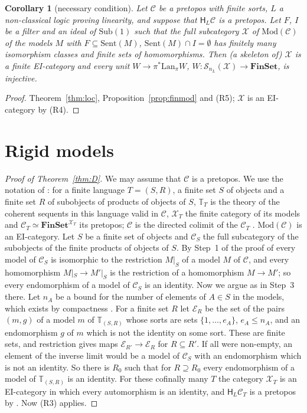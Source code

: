 \documentclass[11pt]{amsart}
\newtheorem{cor}[thm]{Corollary}
\theoremstyle{definition}
\newcommand{\Fin}{\mathbf{FinSet}}
\newcommand{\Sub}{\mathrm{Sub}}
\newcommand{\Mod}{\mathrm{Mod}}
\newcommand{\Sent}{\mathrm{Sent}}
\newcommand{\Lan}{\mathrm{Lan}}
\newcommand{\HH}{\mathsf H}
\newcommand{\cX}{\mathcal X}
\newcommand{\cC}{\mathcal C}
\newcommand{\cS}{\mathcal S}
\newcommand{\bT}{\mathbb T}
\begin{document}
\begin{cor}[necessary condition]\label{cor:nec}
Let $\cC$ be a pretopos with finite sorts, $L$ a non-classical logic proving
linearity, and suppose that $\HH_L\cC$ is a pretopos.
Let $F$, $I$ be a filter and an ideal of $\Sub(1)$ such that the full
subcategory $\cX$ of $\Mod(\cC)$ of the models $M$ with $F\subseteq
\Sent(M)$, $\Sent(M)\cap I=\emptyset$ has finitely many isomorphism
classes and finite sets of homomorphisms. Then (a skeleton of) $\cX$
is a finite EI-category and every unit $W\to\pi^*\Lan_\pi W$, $W\colon
\cS_{n_L}(\cX)\to\Fin$, is injective.
\end{cor}
\begin{proof}
Theorem~\ref{thm:loc}, Proposition~\ref{prop:finmod} and (R5); $\cX$
is an EI-category by (R4).
\end{proof}


\section{Rigid models}

\begin{proof}[Proof of Theorem~\ref{thm:D}]
We may assume that $\cC$ is a pretopos. We use the notation of
\cite[\S5]{Finsorts}: for a finite language $T=(S,R)$, a finite set
$S$ of objects and a finite set $R$ of subobjects of products of
objects of $S$, $\bT_T$ is the theory of the coherent sequents in this
language valid in $\cC$, $\cX_T$ the finite category of its models and
$\cC_T\simeq\Fin^{\cX_T}$ its pretopos; $\cC$ is the directed colimit
of the $\cC_T$ \cite[Lemma~5.2]{Finsorts}. $\Mod(\cC)$ is an
EI-category. Let $S$ be a finite set of objects and $\cC_S$ the full
subcategory of the subobjects of the finite products of objects of
$S$. By Step~1 of the proof of \cite[Prop.~5.4]{Finsorts} every model
of $\cC_S$ is isomorphic to the restriction $M|_S$ of a model $M$ of
$\cC$, and every homomorphism $M|_S\to M'|_S$ is the restriction of a
homomorphism $M\to M'$; so every endomorphism of a model of $\cC_S$ is
an identity. Now we argue as in Step~3 there. Let $n_A$ be a bound for
the number of elements of $A\in S$ in the models, which exists by
compactness \cite[Lemma~4.1]{Finsorts}. For a finite set $R$
let $\mathcal E_R$ be the set of the pairs $(m,g)$ of a model $m$ of
$\bT_{(S,R)}$ whose sorts are sets $\{1,\dots,e_A\}$, $e_A\le n_A$, and
an endomorphism $g$ of $m$ which is not the identity on some sort.
These are finite sets, and restriction gives maps $\mathcal E_{R'}\to
\mathcal E_R$ for $R\subseteq R'$. If all were non-empty, an element
of the inverse limit would be a model of $\cC_S$ with an endomorphism
which is not an identity. So there is $R_0$ such that for $R\supseteq
R_0$ every endomorphism of a model of $\bT_{(S,R)}$ is an identity.
For these cofinally many $T$ the category $\cX_T$ is an EI-category in
which every automorphism is an identity, and $\HH_L\cC_T$ is a
pretopos by \cite[Cor.~6.5]{Strings}. Now (R3) applies.
\end{proof}
\end{document}
